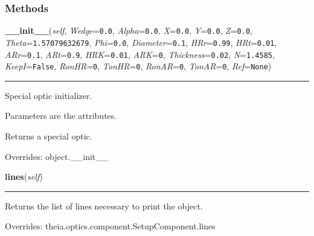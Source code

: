 
  \subsubsection{Methods}

    \vspace{0.5ex}

\hspace{.8\funcindent}\begin{boxedminipage}{\funcwidth}

    \raggedright \textbf{\_\_init\_\_}(\textit{self}, \textit{Wedge}={\tt 0.0}, \textit{Alpha}={\tt 0.0}, \textit{X}={\tt 0.0}, \textit{Y}={\tt 0.0}, \textit{Z}={\tt 0.0}, \textit{Theta}={\tt 1.57079632679}, \textit{Phi}={\tt 0.0}, \textit{Diameter}={\tt 0.1}, \textit{HRr}={\tt 0.99}, \textit{HRt}={\tt 0.01}, \textit{ARr}={\tt 0.1}, \textit{ARt}={\tt 0.9}, \textit{HRK}={\tt 0.01}, \textit{ARK}={\tt 0}, \textit{Thickness}={\tt 0.02}, \textit{N}={\tt 1.4585}, \textit{KeepI}={\tt False}, \textit{RonHR}={\tt 0}, \textit{TonHR}={\tt 0}, \textit{RonAR}={\tt 0}, \textit{TonAR}={\tt 0}, \textit{Ref}={\tt None})

    \vspace{-1.5ex}

    \rule{\textwidth}{0.5\fboxrule}
\setlength{\parskip}{2ex}
    Special optic initializer.

    Parameters are the attributes.

    Returns a special optic.

\setlength{\parskip}{1ex}
      Overrides: object.\_\_init\_\_

    \end{boxedminipage}

    \vspace{0.5ex}

\hspace{.8\funcindent}\begin{boxedminipage}{\funcwidth}

    \raggedright \textbf{lines}(\textit{self})

    \vspace{-1.5ex}

    \rule{\textwidth}{0.5\fboxrule}
\setlength{\parskip}{2ex}
    Returns the list of lines necessary to print the object.

\setlength{\parskip}{1ex}
      Overrides: theia.optics.component.SetupComponent.lines

    \end{boxedminipage}


